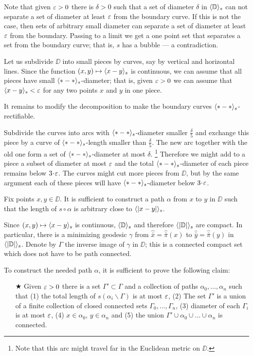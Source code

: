 Note that given $\varepsilon>0$ there is $\delta>0$ such that a set of diameter $\delta$ in $\langle\mathbb{D}\rangle_s$ can not separate a set of diameter at least $\varepsilon$ from the boundary curve.
If this is not the case, 
then sets of arbitrary small diameter can separate a set of diameter at least $\varepsilon$ from the boundary.
Passing to a limit we get a one point set that separates a set from the boundary curve; that is, $s$ has a bubble --- a contradiction. 

Let us subdivide $\DD$ into small pieces by curves, say by vertical and horizontal lines.
Since the function $(x,y)\mapsto \langle x-y\rangle_s$ is continuous,
we can assume that all pieces have small $\langle{*}-{*}\rangle_s$-diameter;
that is, given $\varepsilon>0$ we can assume that $\langle x-y\rangle_s<\varepsilon$ for any two points $x$ and $y$ in one piece.

It remains to modify the decomposition to make the boundary curves $\langle{*}-{*}\rangle_s$-rectifiable.

Subdivide the curves into arcs with $\langle{*}-{*}\rangle_s$-diameter smaller $\tfrac{\delta}{5}$ and exchange this piece by a curve 
of $\langle{*}-{*}\rangle_s$-length smaller than $\tfrac{\delta}{5}$.
The new arc together with the old one form a set of  $\langle{*}-{*}\rangle_s$-diameter at most $\delta$.
\footnote{Note that this arc might travel far in the Euclidean metric on $\DD$.}
Therefore we might add to a piece a subset of diameter at most $\varepsilon$ and the total $\langle{*}-{*}\rangle_s$-diameter of each piece 
remains below $3\cdot\eps$.
The curves might cut more pieces from $\DD$, but by the same argument each of these pieces will have $\langle{*}-{*}\rangle_s$-diameter 
below $3\cdot\eps$.
\qeds

Fix points $x,y\in \DD$.
It is sufficient to construct a path $\alpha$ from $x$ to $y$ in $\DD$ such that the length of $s\circ\alpha$ is arbitrary close to 
$\langle|x-y|\rangle_s$.

Since $(x,y)\mapsto \langle x-y\rangle_s$ is continuous, $\langle\mathbb{D}\rangle_s$ and therefore $\langle|\mathbb{D}|\rangle_s$ are compact.
In particular, there is a minimizing geodesic $\gamma$ from $\hat{\bar x}=\hat{\bar \pi}(x)$ to $\hat{\bar y}=\hat{\bar \pi}(y)$ in $\langle|\mathbb{D}|\rangle_s$.
Denote by $\Gamma$ the inverse image of $\gamma$ in $\DD$;
this is a connected compact set which does not have to be path connected.

To construct the needed path $\alpha$, it is sufficient to prove the following claim:

\begin{itemize}
 \item[$\bigstar$] Given $\varepsilon>0$ there is a set $\Gamma'\subset \Gamma$ 
 and a collection of paths $\alpha_0,\dots,\alpha_n$ such that 
 (1) the total length of $s(\alpha_i\backslash\Gamma)$ is at most $\varepsilon$, 
 (2) The set $\Gamma'$ is a union of a finite collection of closed connected sets $\Gamma_0,\dots,\Gamma_n$, 
 (3) diameter of each $\Gamma_i$ is at most $\varepsilon$, 
 (4) $x\in\alpha_0$, $y\in\alpha_n$ and 
 (5) the union $\Gamma'\cup \alpha_0\cup\dots\cup\alpha_n$ is connected.
\end{itemize}

